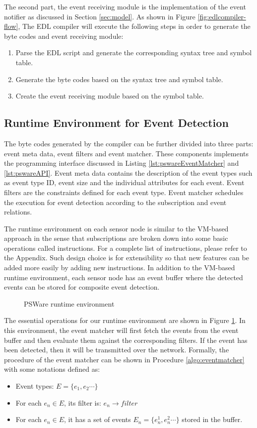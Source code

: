 The second part, the event receiving module is the implementation of the event notifier as discussed in Section \ref{sec:model}. As shown in Figure \ref{fig:edlcompiler-flow}, The EDL compiler will execute the following steps in order to generate the byte codes and event receiving module:
\begin{enumerate}
\item Parse the EDL script and generate the corresponding syntax tree and symbol table.
\item Generate the byte codes based on the syntax tree and symbol table.
\item Create the event receiving module based on the symbol table.
\end{enumerate}

\subsection{Runtime Environment for Event Detection}
The byte codes generated by the compiler can be further divided into three parts: event meta data, event filters and event matcher. These components implements the programming interface discussed in Listing \ref{lst:pswareEventMatcher} and \ref{lst:pswareAPI}. Event meta data contains the description of the event types such as event type ID, event size and the individual attributes for each event. Event filters are the constraints defined for each event type. Event matcher schedules the execution for event detection according to the subscription and event relations.

The runtime environment on each sensor node is similar to the VM-based approach \cite{mate} in the sense that subscriptions are broken down into some basic operations called instructions. For a complete list of instructions, please refer to the Appendix. Such design choice is for extensibility so that new features can be added more easily by adding new instructions. In addition to the VM-based runtime environment, each sensor node has an event buffer where the detected events can be stored for composite event detection.

\begin{figure}
\centering
{}
\caption{PSWare runtime environment}
\label{fig:eventdetectionframework2}
\end{figure}
The essential operations for our runtime environment are shown in Figure \ref{fig:eventdetectionframework2}. In this environment, the event matcher will first fetch the events from the event buffer and then evaluate them against the corresponding filters. If the event has been detected, then it will be transmitted over the network. Formally, the procedure of the event matcher can be shown in Procedure \ref{algo:eventmatcher} with some notations defined as:
\begin{itemize}
\item Event types: \(E=\{e_1, e_2 \cdots \}\)
\item For each \(e_n\in E\), its filter is: \(e_n\rightarrow filter\)
\item For each \(e_n\in E\), it has a set of events \(E_n=\{e_n^1, e_n^2 \cdots \}\) stored in the buffer.
\end{itemize}

